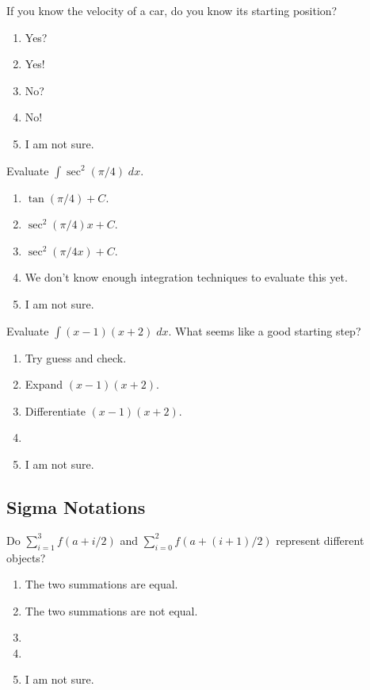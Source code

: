 \documentclass[aspectratio=169, 14pt, t]{beamer}  %
\begin{document}
\begin{poll}
  If you know the velocity of a car, do you know its starting position?

  \begin{enumerate}
    \item Yes?
    \item Yes!
    \item No?
    \item No!
    \item I am not sure.
  \end{enumerate}
\end{poll}

\begin{poll}
  Evaluate \(\int \sec^{2}(\pi/4) \;dx\).

  \begin{enumerate}
    \item \(\tan(\pi/4) + C\).
    \item \(\sec^{2}(\pi/4)x + C\).
    \item \(\sec^{2}(\pi/4x) + C\).
    \item We don't know enough integration techniques to evaluate this yet.
    \item I am not sure.
  \end{enumerate}
\end{poll}

\begin{poll}
  Evaluate \(\int (x-1)(x+2) \;dx\). What seems like a good starting step?

  \begin{enumerate}
    \item Try guess and check.
    \item Expand \((x-1)(x+2)\).
    \item Differentiate \((x-1)(x+2)\).
    \item
    \item I am not sure.
  \end{enumerate}
\end{poll}

\subsection{Sigma Notations}

\begin{poll}
  Do \(\sum_{i=1}^{3} f(a + i/2)\) and \(\sum_{i=0}^{2} f(a + (i+1)/2)\) represent different objects?

  \begin{enumerate}
    \item The two summations are equal.
    \item The two summations are not equal.
    \item
    \item
    \item I am not sure.
  \end{enumerate}
\end{poll}
\end{document}
